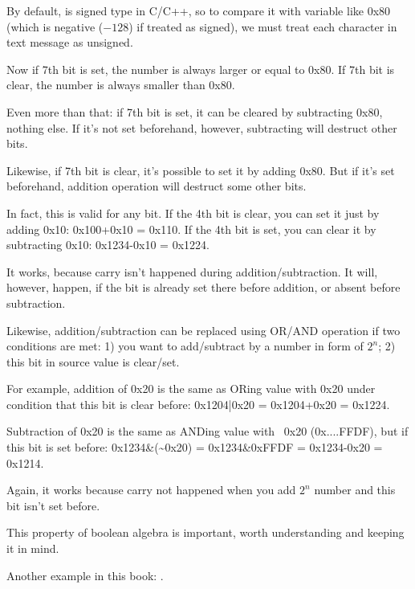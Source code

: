 By default,  is signed type in C/C++, so to compare it with variable like 0x80 (which is negative ($-128$)
if treated as signed),
we must treat each character in text message as unsigned.

Now if 7th bit is set, the number is always larger or equal to 0x80.
If 7th bit is clear, the number is always smaller than 0x80.

Even more than that: if 7th bit is set, it can be cleared by subtracting 0x80, nothing else.
If it's not set beforehand, however, subtracting will destruct other bits.

Likewise, if 7th bit is clear, it's possible to set it by adding 0x80.
But if it's set beforehand, addition operation will destruct some other bits.

In fact, this is valid for any bit.
If the 4th bit is clear, you can set it just by adding 0x10: 0x100+0x10 = 0x110.
If the 4th bit is set, you can clear it by subtracting 0x10: 0x1234-0x10 = 0x1224.

It works, because carry isn't happened during addition/subtraction.
It will, however, happen, if the bit is already set there before addition, or absent before subtraction.

Likewise, addition/subtraction can be replaced using OR/AND operation if two conditions are met:
1) you want to add/subtract by a number in form of $2^n$;
2) this bit in source value is clear/set.

For example, addition of 0x20 is the same as ORing value with 0x20 under condition that this bit is clear before:
0x1204|0x20 = 0x1204+0x20 = 0x1224.

Subtraction of 0x20 is the same as ANDing value with ~0x20 (0x....FFDF), but if this bit is set before:
0x1234\&(\~{}0x20) = 0x1234\&0xFFDF = 0x1234-0x20 = 0x1214.

Again, it works because carry not happened when you add $2^n$ number and this bit isn't set before.

This property of boolean algebra is important, worth understanding and keeping it in mind.

Another example in this book: .

